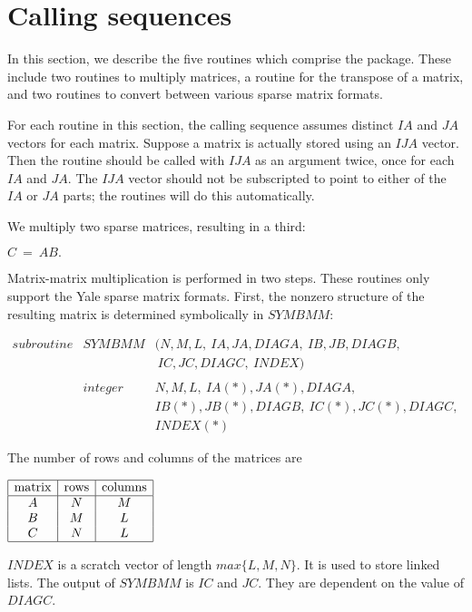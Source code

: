  
\section{Calling sequences}
\label{Sec:CallingSequences}
 
In this section, we describe the five routines which comprise the package.
These include two routines to multiply matrices, a routine for the transpose
of a matrix, and two routines to convert between various sparse matrix
formats.
 
For each routine in this section, the calling sequence assumes distinct $IA$
and $JA$ vectors for each matrix.  Suppose a matrix is actually stored using
an $IJA$ vector.  Then the routine should be called with $IJA$ as an argument
twice, once for each $IA$ and $JA$.  The $IJA$ vector should not be
subscripted to point to either of the $IA$ or $JA$ parts; the routines will do
this automatically.
 
We multiply two sparse matrices, resulting in a third:
\begin{center}
$C\ =\ AB.$
\end{center}
Matrix-matrix multiplication is performed in two steps.  These routines only
support the Yale sparse matrix formats.  First, the nonzero structure of the
resulting matrix is determined symbolically in $SYMBMM$:
\begin{center}
$\begin{array}{lll}
subroutine & SYMBMM  & (N,M,L,\ IA,JA,DIAGA,\ IB,JB,DIAGB,\\
           &         & \ IC,JC,DIAGC,\ INDEX)\\
           &         & \\
           & integer & N,M,L,\ IA(*),JA(*),DIAGA,\\
           &         & IB(*),JB(*),DIAGB,\ IC(*),JC(*),DIAGC,\\
           &         & INDEX(*)
\end{array}$
\end{center}
The number of rows and columns of the matrices are
\begin{center}
$\begin{array}{|c|c|c|}\hline
{\rm matrix} & {\rm rows} & {\rm columns} \\ \hline
A            & N          & M\\
B            & M          & L\\
C            & N          & L\\ \hline
\end{array}$
\end{center}
$INDEX$ is a scratch vector of length $max\{L,M,N\}$.  It is used to store
linked lists.  The output of $SYMBMM$ is $IC$ and $JC$.  They are dependent on
the value of $DIAGC$.
 
